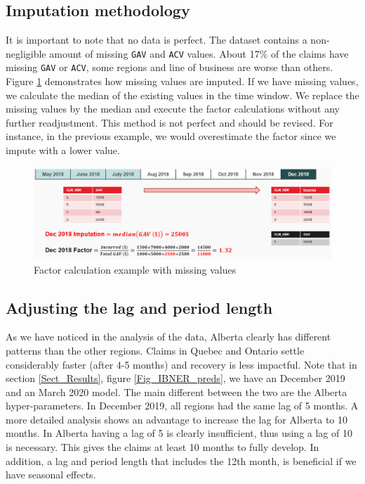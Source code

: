 \subsection{Imputation methodology}
	It is important to note that no data is perfect. The dataset contains a non-negligible amount of missing \texttt{GAV} and \texttt{ACV} values. About 17\% of the claims have missing \texttt{GAV} or \texttt{ACV}, some regions and line of business are worse than others. Figure \ref{Fig_imputation_example} demonstrates how missing values are imputed. If we have missing values, we calculate the median of the existing values in the time window. We replace the missing values by the median and execute the factor calculations without any further readjustment. This method is not perfect and should be revised. For instance, in the previous example, we would overestimate the factor since we impute with a lower value.  
	\begin{figure}[H]
		\begin{center}
			\includegraphics[scale=0.4]{Graphiques/imputation_example} 
			\renewcommand{\figurename}{Figure}
			\caption{Factor calculation example with missing values}\label{Fig_imputation_example}
		\end{center}
	\end{figure}

\subsection{Adjusting the lag and period length}\label{Sect_dec_march}
As we have noticed in the analysis of the data, Alberta clearly has different patterns than the other regions. Claims in Quebec and Ontario settle considerably faster (after 4-5 months) and recovery is less impactful. Note that in section \ref{Sect_Results}, figure \ref{Fig_IBNER_preds}, we have an December 2019 and an March 2020 model. The main different between the two are the Alberta hyper-parameters. In December 2019, all regions had the same lag of 5 months. A more detailed analysis shows an advantage to increase the lag for Alberta to 10 months.  In Alberta having a lag of 5 is clearly insufficient, thus using a lag of 10 is necessary. This gives the claims at least 10 months to fully develop. In addition, a lag and period length that includes the 12th month, is beneficial if we have seasonal effects.

